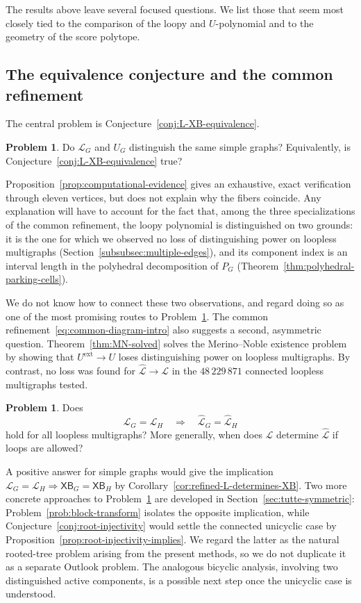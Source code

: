 \documentclass[11pt]{article}
\theoremstyle{plain}
\theoremstyle{definition}
\newtheorem{problem}[theorem]{Problem}
\renewcommand{\mathcal}{\mathscr}
\newcommand{\LL}{\mathcal{L}}    %
\newcommand{\XB}{\mathsf{XB}} %
\newcommand{\ext}{\mathrm{ext}}
\numberwithin{equation}{section}
\begin{document}
The results above leave several focused questions.  We list those that seem
most closely tied to the comparison of the loopy and $U$-polynomial
and to the geometry of the score polytope.

\subsection{The equivalence conjecture and the common refinement}
\label{subsec:outlook-equivalence}

The central problem is Conjecture~\ref{conj:L-XB-equivalence}.

\begin{problem}\label{prob:L-vs-U}
  Do $\LL_G$ and $U_G$ distinguish the same simple graphs?  Equivalently,
  is Conjecture~\ref{conj:L-XB-equivalence} true?
\end{problem}

Proposition~\ref{prop:computational-evidence} gives an exhaustive, exact verification
through eleven vertices, but does not explain why the fibers coincide.
Any explanation will have to account for the fact that,
among the three specializations of the common refinement, the loopy polynomial
is distinguished on two grounds: it is the one for which we observed no loss
of distinguishing power on loopless multigraphs
(Section~\ref{subsubsec:multiple-edges}), and its component index is an interval length
in the polyhedral decomposition of $P_G$
(Theorem~\ref{thm:polyhedral-parking-cells}).



We do not know how to connect these two observations, and regard doing so as one of the most promising routes
to Problem~\ref{prob:L-vs-U}.  The common
refinement~\eqref{eq:common-diagram-intro} also suggests a second, asymmetric
question.  Theorem~\ref{thm:MN-solved} solves the Merino--Noble existence problem by
showing that $U^{\ext}\to U$ loses distinguishing power on loopless
multigraphs.  By contrast, no loss was found for $\widehat{\LL}\to\LL$ in
the $48\,229\,871$ connected loopless multigraphs tested.

\begin{problem}\label{prob:extended}
Does
\[
   \LL_G=\LL_H \quad \Longrightarrow\quad  \widehat{\LL}_G=\widehat{\LL}_H
\]
hold for all loopless multigraphs?
More generally, when does $\LL$ determine  $\widehat{\LL}$ if loops are allowed?
\end{problem}

A positive answer for simple graphs would give the implication
$\LL_G=\LL_H\Rightarrow \XB_G=\XB_H$ by
Corollary~\ref{cor:refined-L-determines-XB}.  Two more concrete approaches to
Problem~\ref{prob:L-vs-U} are developed in Section~\ref{sec:tutte-symmetric}:
Problem~\ref{prob:block-transform} isolates the opposite implication, while
Conjecture~\ref{conj:root-injectivity} would settle the connected unicyclic
case by Proposition~\ref{prop:root-injectivity-implies}.  We regard the latter
as the natural rooted-tree problem arising from the present methods, so we do
not duplicate it as a separate Outlook problem.  The analogous bicyclic
analysis, involving two distinguished active components, is a possible next
step once the unicyclic case is understood.
\end{document}
